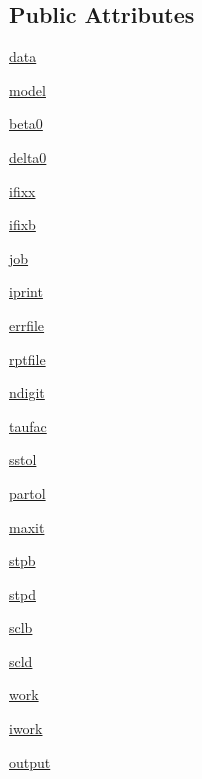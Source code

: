 \subsection*{Public Attributes}
\begin{DoxyCompactItemize}
\item 
\hyperlink{classscipy_1_1odr_1_1odrpack_1_1ODR_a8544568f608cba96428c58ce17a5b56c}{data}
\item 
\hyperlink{classscipy_1_1odr_1_1odrpack_1_1ODR_af46aba7e7154b097040d196c3300ceb8}{model}
\item 
\hyperlink{classscipy_1_1odr_1_1odrpack_1_1ODR_ac105b38016aa77c3eed9b2df5a12b3e5}{beta0}
\item 
\hyperlink{classscipy_1_1odr_1_1odrpack_1_1ODR_ad49b269aa15072b13a152a38d7b4eefc}{delta0}
\item 
\hyperlink{classscipy_1_1odr_1_1odrpack_1_1ODR_a4d572d0b9e1cba857ff62f571f8f094d}{ifixx}
\item 
\hyperlink{classscipy_1_1odr_1_1odrpack_1_1ODR_af0759f9ad555e90915d5a8858ea61a4c}{ifixb}
\item 
\hyperlink{classscipy_1_1odr_1_1odrpack_1_1ODR_a7a98780434aa401c886ccdb03cdac31c}{job}
\item 
\hyperlink{classscipy_1_1odr_1_1odrpack_1_1ODR_a29314683ef99f61e80d65243df9d4dfc}{iprint}
\item 
\hyperlink{classscipy_1_1odr_1_1odrpack_1_1ODR_aac616d7aa3c625c12bc8eb580e49576a}{errfile}
\item 
\hyperlink{classscipy_1_1odr_1_1odrpack_1_1ODR_ae624aaf31b887c4d1799a8a44ab920cc}{rptfile}
\item 
\hyperlink{classscipy_1_1odr_1_1odrpack_1_1ODR_aa992974e95e4e16642dbdecec75c5d7b}{ndigit}
\item 
\hyperlink{classscipy_1_1odr_1_1odrpack_1_1ODR_abb35fe7fdc76a4da005754c2e9cb280f}{taufac}
\item 
\hyperlink{classscipy_1_1odr_1_1odrpack_1_1ODR_a3b80dcfdf9a1b20eaf3a69487d9df127}{sstol}
\item 
\hyperlink{classscipy_1_1odr_1_1odrpack_1_1ODR_a2b2943866a7612d9605e774772054c6f}{partol}
\item 
\hyperlink{classscipy_1_1odr_1_1odrpack_1_1ODR_a7c3225f01ed271775b08e59529ddcc61}{maxit}
\item 
\hyperlink{classscipy_1_1odr_1_1odrpack_1_1ODR_a9e95b9372d8ae02d95961c990b6154d4}{stpb}
\item 
\hyperlink{classscipy_1_1odr_1_1odrpack_1_1ODR_a9cd8ca51432cfb48a7b3154aae5cff25}{stpd}
\item 
\hyperlink{classscipy_1_1odr_1_1odrpack_1_1ODR_a4c4565cbcee8f511aa194479fab35b53}{sclb}
\item 
\hyperlink{classscipy_1_1odr_1_1odrpack_1_1ODR_a98eabaa0c7e86920288052b6bd978f0b}{scld}
\item 
\hyperlink{classscipy_1_1odr_1_1odrpack_1_1ODR_a7374d5b8578845b51374789404928104}{work}
\item 
\hyperlink{classscipy_1_1odr_1_1odrpack_1_1ODR_a6d665ff2a9cbd83be14dca118ef08ffb}{iwork}
\item 
\hyperlink{classscipy_1_1odr_1_1odrpack_1_1ODR_ae5e0dfdfdd1477abe00b5adb2b9a560c}{output}
\end{DoxyCompactItemize}



